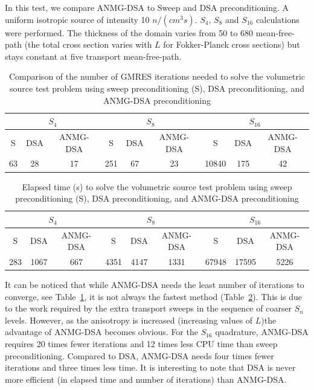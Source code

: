 \documentclass[preprint,10pt]{elsarticle}
\renewcommand{\(}{\left(}
\renewcommand{\)}{\right)}
\renewcommand{\[}{\left[}
\renewcommand{\]}{\right]}
\newcommand{\tbl}[1]{Table~\ref{#1}}                     %
\begin{document}
In this test, we compare ANMG-DSA to Sweep and DSA preconditioning. A uniform 
isotropic source of intensity 10 $n/(cm^3s)$. $S_4$, $S_8$ and $S_{16}$ calculations
were performed. The thickness of the domain varies from
50 to 680 mean-free-path (the total cross section varies with $L$ for
Fokker-Planck cross sections) but stays constant at five transport mean-free-path.
%
\begin{table}[H]
\begin{center}
\begin{tabular}{|c|c|c||c|c|c||c|c|c|}
\hline
\multicolumn{3}{|c||}{$S_4$} & \multicolumn{3}{c||}{$S_8$} & 
\multicolumn{3}{c|}{$S_{16}$} \\
\hline  
S & DSA & ANMG-DSA & S & DSA & ANMG-DSA & S & DSA & ANMG-DSA\\
\hline
63 & 28 & 17 & 251 & 67 & 23 & 10840 & 175 & 42 \\
\hline
\end{tabular}
\caption{Comparison of the number of GMRES iterations needed to solve the volumetric source 
test problem using sweep preconditioning (S), DSA preconditioning, and ANMG-DSA preconditioning}
\label{tab:2}
\end{center}
\end{table}
%
%
\begin{table}[H]
\begin{center}
\begin{tabular}{|c|c|c||c|c|c||c|c|c|}
\hline
\multicolumn{3}{|c||}{$S_4$} & \multicolumn{3}{c||}{$S_8$} & 
\multicolumn{3}{c|}{$S_{16}$} \\
\hline  
S & DSA & ANMG-DSA & S & DSA & ANMG-DSA & S & DSA & ANMG-DSA\\
\hline
283 & 1067 & 667 & 4351 & 4147 & 1331 & 67948 & 17595 & 5226 \\
\hline
\end{tabular}
\caption{Elapsed time (s) to solve the volumetric source test problem using sweep 
preconditioning (S), DSA preconditioning, and ANMG-DSA preconditioning}
\label{tab:3}
\end{center}
\end{table}
It can be noticed that while ANMG-DSA needs the least number of iterations to converge, see \tbl{tab:2}, 
it is not always the fastest method (\tbl{tab:3}). This is due to the work required by the extra
transport sweeps in the sequence of coarser $S_n$ levels. However, as the anisotropy is increased 
(increasing values of $L$)the advantage of
ANMG-DSA becomes obvious. For the $S_{16}$ quadrature, ANMG-DSA requires 20 times 
fewer iterations and 12 times less CPU time than sweep preconditioning. 
Compared to DSA, ANMG-DSA needs four times fewer iterations and three times less 
time. It is interesting to note that DSA is never more efficient (in elapsed
time and number of iterations) than ANMG-DSA.
\end{document}
